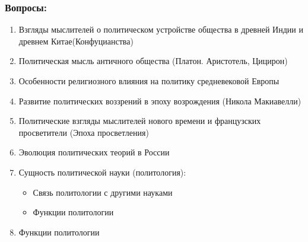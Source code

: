 \subsubsection{Вопросы:}
\begin{enumerate}
    \item Взгляды мыслителей о политическом устройстве общества в древней Индии и древнем Китае(Конфуцианства)
    \item Политическая мысль античного общества (Платон. Аристотель, Цицирон)
    \item Особенности религиозного влияния на политику средневековой Европы
    \item Развитие политических воззрений в эпоху возрождения (Никола Макиавелли)
    \item Политические взгляды мыслителей нового времени и французских просветители (Эпоха просветления)
    \item Эволюция политических теорий в России
    \item Сущность политической науки (политология):
          \begin{itemize}
              \item Связь политологии с другими науками
              \item Функции политологии
          \end{itemize}
    \item Функции политологии
\end{enumerate}